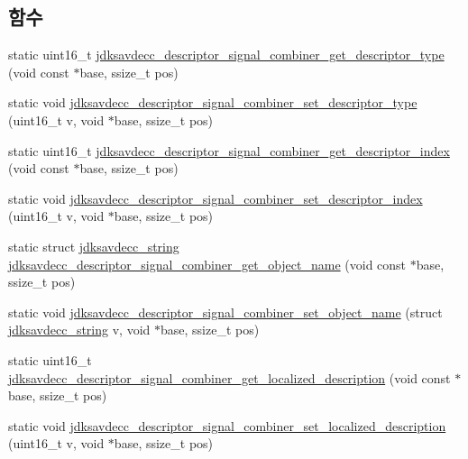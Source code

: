 \subsection*{함수}
\begin{DoxyCompactItemize}
\item 
static uint16\+\_\+t \hyperlink{group__descriptor__signal__combiner_gad2ba52eb53fccd2028f8a2f140a4c8ad}{jdksavdecc\+\_\+descriptor\+\_\+signal\+\_\+combiner\+\_\+get\+\_\+descriptor\+\_\+type} (void const $\ast$base, ssize\+\_\+t pos)
\item 
static void \hyperlink{group__descriptor__signal__combiner_ga611bc66a433b751053c8b63d38a9c07f}{jdksavdecc\+\_\+descriptor\+\_\+signal\+\_\+combiner\+\_\+set\+\_\+descriptor\+\_\+type} (uint16\+\_\+t v, void $\ast$base, ssize\+\_\+t pos)
\item 
static uint16\+\_\+t \hyperlink{group__descriptor__signal__combiner_ga147493630015a19ab876ca78154b60d8}{jdksavdecc\+\_\+descriptor\+\_\+signal\+\_\+combiner\+\_\+get\+\_\+descriptor\+\_\+index} (void const $\ast$base, ssize\+\_\+t pos)
\item 
static void \hyperlink{group__descriptor__signal__combiner_gab8c10bcf6709c9a41edbd1452141abae}{jdksavdecc\+\_\+descriptor\+\_\+signal\+\_\+combiner\+\_\+set\+\_\+descriptor\+\_\+index} (uint16\+\_\+t v, void $\ast$base, ssize\+\_\+t pos)
\item 
static struct \hyperlink{structjdksavdecc__string}{jdksavdecc\+\_\+string} \hyperlink{group__descriptor__signal__combiner_ga5a2975bf9c2419a86a1654ce65a52bae}{jdksavdecc\+\_\+descriptor\+\_\+signal\+\_\+combiner\+\_\+get\+\_\+object\+\_\+name} (void const $\ast$base, ssize\+\_\+t pos)
\item 
static void \hyperlink{group__descriptor__signal__combiner_ga1b383e3ece9706c99e7edadd87cea3f3}{jdksavdecc\+\_\+descriptor\+\_\+signal\+\_\+combiner\+\_\+set\+\_\+object\+\_\+name} (struct \hyperlink{structjdksavdecc__string}{jdksavdecc\+\_\+string} v, void $\ast$base, ssize\+\_\+t pos)
\item 
static uint16\+\_\+t \hyperlink{group__descriptor__signal__combiner_ga916695b11a6599ae54cbaccca506bb3b}{jdksavdecc\+\_\+descriptor\+\_\+signal\+\_\+combiner\+\_\+get\+\_\+localized\+\_\+description} (void const $\ast$base, ssize\+\_\+t pos)
\item 
static void \hyperlink{group__descriptor__signal__combiner_ga0d699c4d40a2ed264f21468c4bcda7fc}{jdksavdecc\+\_\+descriptor\+\_\+signal\+\_\+combiner\+\_\+set\+\_\+localized\+\_\+description} (uint16\+\_\+t v, void $\ast$base, ssize\+\_\+t pos)

\end{DoxyCompactItemize}
